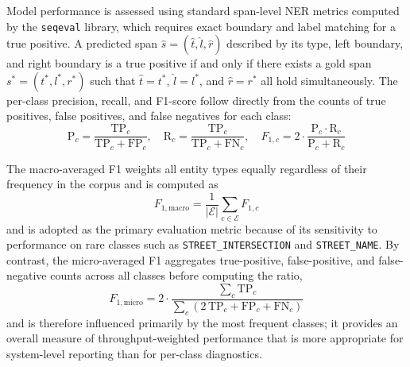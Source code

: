 Model performance is assessed using standard span-level NER metrics computed by the \texttt{seqeval} library, which requires exact boundary and label matching for a true positive. A predicted span $\hat{s} = (\hat{t}, \hat{l}, \hat{r})$ described by its type, left boundary, and right boundary is a true positive if and only if there exists a gold span $s^* = (t^*, l^*, r^*)$ such that $\hat{t} = t^*$, $\hat{l} = l^*$, and $\hat{r} = r^*$ all hold simultaneously. The per-class precision, recall, and F1-score follow directly from the counts of true positives, false positives, and false negatives for each class:
\begin{equation}
  \text{P}_c = \frac{\text{TP}_c}{\text{TP}_c + \text{FP}_c}, \quad
  \text{R}_c = \frac{\text{TP}_c}{\text{TP}_c + \text{FN}_c}, \quad
  F_{1,c} = 2 \cdot \frac{\text{P}_c \cdot \text{R}_c}{\text{P}_c + \text{R}_c}
  \label{eq:per_class_f1_ch1}
\end{equation}

The macro-averaged F1 weights all entity types equally regardless of their frequency in the corpus and is computed as
\begin{equation}
  F_{1,\text{macro}} = \frac{1}{|\mathcal{E}|} \sum_{c \in \mathcal{E}} F_{1,c}
  \label{eq:macro_f1_ch1}
\end{equation}
and is adopted as the primary evaluation metric because of its sensitivity to performance on rare classes such as \texttt{STREET\_INTERSECTION} and \texttt{STREET\_NAME}. By contrast, the micro-averaged F1 aggregates true-positive, false-positive, and false-negative counts across all classes before computing the ratio,
\begin{equation}
  F_{1,\text{micro}} = 2 \cdot \frac{\sum_c \text{TP}_c}{\sum_c (2\,\text{TP}_c + \text{FP}_c + \text{FN}_c)}
  \label{eq:micro_f1_ch1}
\end{equation}
and is therefore influenced primarily by the most frequent classes; it provides an overall measure of throughput-weighted performance that is more appropriate for system-level reporting than for per-class diagnostics.

